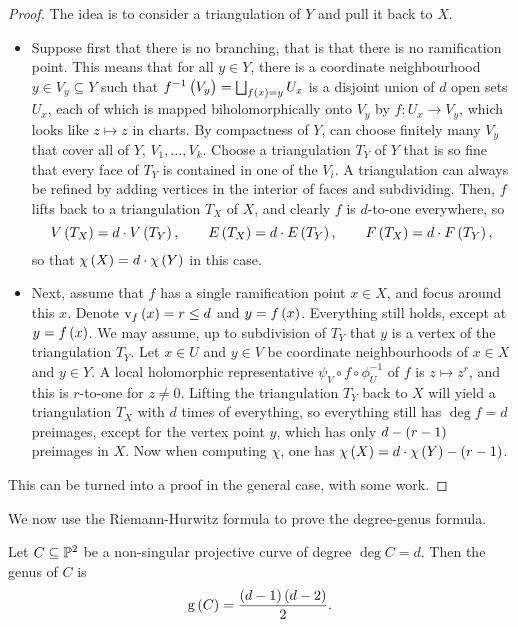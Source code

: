 \begin{proof}
The idea is to consider a triangulation of $ Y $ and pull it back to $ X $.
\begin{itemize}
\item Suppose first that there is no branching, that is that there is no ramification point. This means that for all $ y \in Y $, there is a coordinate neighbourhood $ y \in V_y \subseteq Y $ such that $ f^{-1}\br{V_y} = \bigsqcup_{f\br{x} = y} U_x $ is a disjoint union of $ d $ open sets $ U_x $, each of which is mapped biholomorphically onto $ V_y $ by $ f : U_x \to V_y $, which looks like $ z \mapsto z $ in charts. By compactness of $ Y $, can choose finitely many $ V_y $ that cover all of $ Y $, $ V_1, \dots, V_k $. Choose a triangulation $ T_Y $ of $ Y $ that is so fine that every face of $ T_Y $ is contained in one of the $ V_i $. A triangulation can always be refined by adding vertices in the interior of faces and subdividing. Then, $ f $ lifts back to a triangulation $ T_X $ of $ X $, and clearly $ f $ is $ d $-to-one everywhere, so
$$ V\br{T_X} = d \cdot V\br{T_Y}, \qquad E\br{T_X} = d \cdot E\br{T_Y}, \qquad F\br{T_X} = d \cdot F\br{T_Y}, $$
so that $ \chi\br{X} = d \cdot \chi\br{Y} $ in this case.
\item Next, assume that $ f $ has a single ramification point $ x \in X $, and focus around this $ x $. Denote $ \v_f\br{x} = r \le d $ and $ y = f\br{x} $. Everything still holds, except at $ y = f\br{x} $. We may assume, up to subdivision of $ T_Y $ that $ y $ is a vertex of the triangulation $ T_Y $. Let $ x \in U $ and $ y \in V $ be coordinate neighbourhoods of $ x \in X $ and $ y \in Y $. A local holomorphic representative $ \psi_V \circ f \circ \phi_U^{-1} $ of $ f $ is $ z \mapsto z^r $, and this is $ r $-to-one for $ z \ne 0 $. Lifting the triangulation $ T_Y $ back to $ X $ will yield a triangulation $ T_X $ with $ d $ times of everything, so everything still has $ \deg f = d $ preimages, except for the vertex point $ y $, which has only $ d - \br{r - 1} $ preimages in $ X $. Now when computing $ \chi $, one has $ \chi\br{X} = d \cdot \chi\br{Y} - \br{r - 1} $.
\end{itemize}
This can be turned into a proof in the general case, with some work.
\end{proof}

We now use the Riemann-Hurwitz formula to prove the degree-genus formula.

\begin{theorem}
Let $ C \subseteq \mathbb{P}^2 $ be a non-singular projective curve of degree $ \deg C = d $. Then the genus of $ C $ is
$$ \g\br{C} = \dfrac{\br{d - 1}\br{d - 2}}{2}. $$
\end{theorem}

